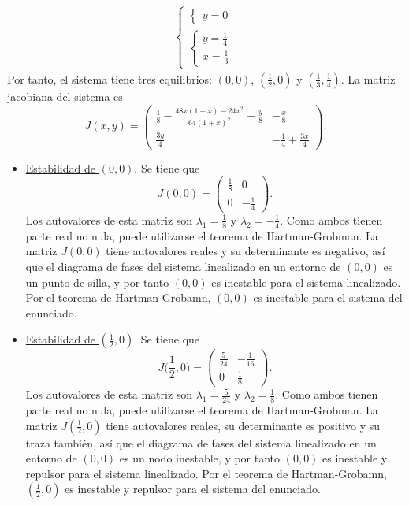 \documentclass[11pt]{report}
\begin{document}
\begin{solution}
\begin{enumerate}
\begin{align*}
\begin{cases}
\begin{cases}
                    y = 0
                \end{cases} \\[25pt]                
                \begin{cases}
                    \displaystyle y = \frac{1}{4} \\[10pt]
                    \displaystyle x = \frac{1}{3}
                \end{cases}
            \end{cases}
        \end{align*}
        Por tanto, el sistema tiene tres equilibrios: $(0,0)$, $(\frac{1}{2},0)$ y $(\frac{1}{3},\frac{1} {4})$. La matriz jacobiana del sistema es
        \[J(x,y) = \left(\begin{array}{cc}
            \frac{1}{8}-\frac{48x(1+x)-24x^2}{64(1+x)^2} -\frac{y}{8} & -\frac{x}{8} \\[10pt]
            \frac{3y}{4} & -\frac{1}{4}+\frac{3x}{4}
        \end{array}\right).\]
        \begin{itemize}
            \item \underline{Estabilidad de $(0,0)$}. Se tiene que
            \[J(0,0) = \left(\begin{array}{cc}
                \frac{1}{8} & 0 \\
                0 & -\frac{1}{4}
            \end{array}\right).\]
            Los autovalores de esta matriz son $\lambda_1 = \frac{1}{8}$ y $\lambda_2 = -\frac{1}{4}$. Como ambos tienen parte real no nula, puede utilizarse el teorema de Hartman-Grobman. La matriz $J(0,0)$ tiene autovalores reales y su determinante es negativo, así que el diagrama de fases del sistema linealizado en un entorno de $(0,0)$ es un punto de silla, y por tanto $(0,0)$ es inestable para el sistema linealizado. Por el teorema de Hartman-Grobamn, $(0,0)$ es inestable para el sistema del enunciado.
            \item \underline{Estabilidad de $(\frac{1}{2},0)$}. Se tiene que
            \[J\bigl(\frac{1}{2},0\bigr) = \left(\begin{array}{cc}
                \frac{5}{24} & -\frac{1}{16} \\[10pt]
                0 & \frac{1}{8}
            \end{array}\right).\]
            Los autovalores de esta matriz son $\lambda_1 = \frac{5}{24}$ y $\lambda_2 = \frac{1}{8}$. Como ambos tienen parte real no nula, puede utilizarse el teorema de Hartman-Grobman. La matriz $J(\frac{1}{2},0)$ tiene autovalores reales, su determinante es positivo y su traza también, así que el diagrama de fases del sistema linealizado en un entorno de $(0,0)$ es un nodo inestable, y por tanto $(0,0)$ es inestable y repulsor para el sistema linealizado. Por el teorema de Hartman-Grobamn, $(\frac{1}{2},0)$ es inestable y repulsor para el sistema del enunciado.

\end{itemize}
\end{enumerate}
\end{solution}
\end{document}
